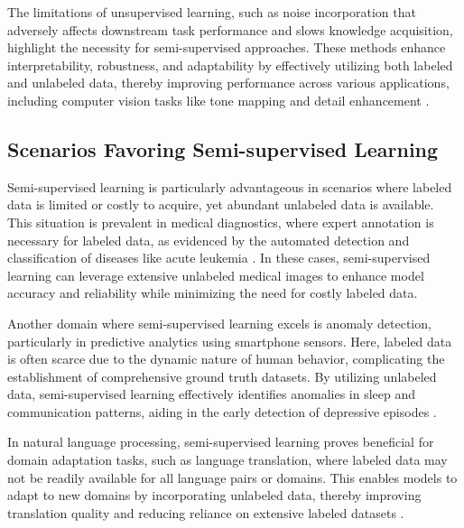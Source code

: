 The limitations of unsupervised learning, such as noise incorporation that adversely affects downstream task performance and slows knowledge acquisition, highlight the necessity for semi-supervised approaches. These methods enhance interpretability, robustness, and adaptability by effectively utilizing both labeled and unlabeled data, thereby improving performance across various applications, including computer vision tasks like tone mapping and detail enhancement \cite{fan2018imagesmoothingunsupervisedlearning,tang2023mvpmultitasksupervisedpretraining,jang2024visualdeltageneratorlarge}.

\subsection{Scenarios Favoring Semi-supervised Learning} \label{subsec:Scenarios Favoring Semi-supervised Learning}

Semi-supervised learning is particularly advantageous in scenarios where labeled data is limited or costly to acquire, yet abundant unlabeled data is available. This situation is prevalent in medical diagnostics, where expert annotation is necessary for labeled data, as evidenced by the automated detection and classification of diseases like acute leukemia \cite{zolfaghari2023surveyautomateddetectionclassification}. In these cases, semi-supervised learning can leverage extensive unlabeled medical images to enhance model accuracy and reliability while minimizing the need for costly labeled data.

Another domain where semi-supervised learning excels is anomaly detection, particularly in predictive analytics using smartphone sensors. Here, labeled data is often scarce due to the dynamic nature of human behavior, complicating the establishment of comprehensive ground truth datasets. By utilizing unlabeled data, semi-supervised learning effectively identifies anomalies in sleep and communication patterns, aiding in the early detection of depressive episodes \cite{jeong2016predictiveanalyticsusingsmartphone}.

In natural language processing, semi-supervised learning proves beneficial for domain adaptation tasks, such as language translation, where labeled data may not be readily available for all language pairs or domains. This enables models to adapt to new domains by incorporating unlabeled data, thereby improving translation quality and reducing reliance on extensive labeled datasets \cite{bogoychev2020domaintranslationesenoisesynthetic}.

